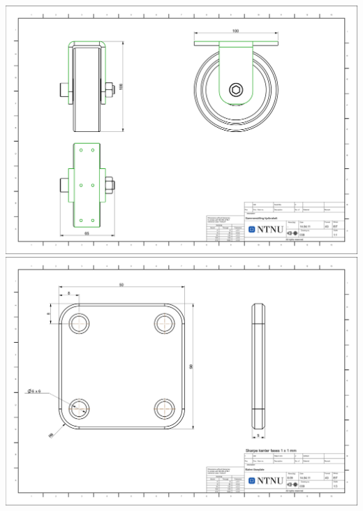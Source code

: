 \includegraphics[angle=90, width=\textwidth]{arbeidstegninger/038}\newpage
\includegraphics[angle=90, width=\textwidth]{arbeidstegninger/039}




